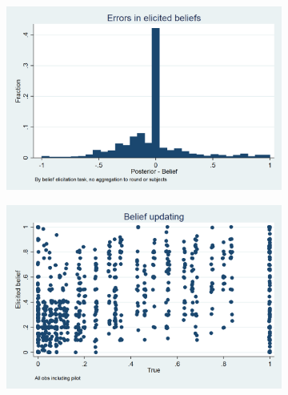 \documentclass[11pt,a4paper]{article}
\begin{document}
\begin{figure}[!h]
\centering
\caption{Belief Updating}
\begin{subfigure}[t]{.48\textwidth}
  \centering
  \includegraphics[width=\textwidth]{Graphs/hist_belief_error.png}
\end{subfigure}
\begin{subfigure}[t]{.48\textwidth}
  \centering
  \includegraphics[width=\textwidth]{Graphs/updating_s1.png}
\end{subfigure}

\end{figure}
\end{document}
